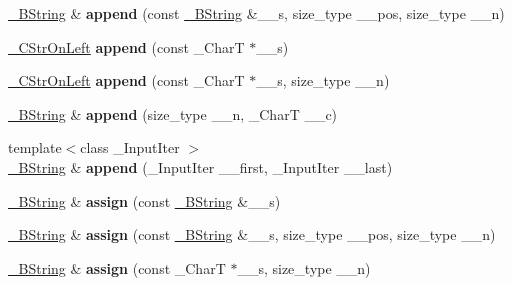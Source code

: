 \begin{DoxyCompactItemize}
\hyperlink{classbasic__string}{\+\_\+\+B\+String} \& {\bfseries append} (const \hyperlink{classbasic__string}{\+\_\+\+B\+String} \&\+\_\+\+\_\+s, size\+\_\+type \+\_\+\+\_\+pos, size\+\_\+type \+\_\+\+\_\+n)
\item 
\mbox{\label{class____bstr__sum_abe3625bf2f36c7c615fcaa46539a7668}} 
\hyperlink{class____bstr__sum}{\+\_\+\+C\+Str\+On\+Left} {\bfseries append} (const \+\_\+\+CharT $\ast$\+\_\+\+\_\+s)
\item 
\mbox{\label{class____bstr__sum_ad84482bb4ffb623cbbfc86500ae9c155}} 
\hyperlink{class____bstr__sum}{\+\_\+\+C\+Str\+On\+Left} {\bfseries append} (const \+\_\+\+CharT $\ast$\+\_\+\+\_\+s, size\+\_\+type \+\_\+\+\_\+n)
\item 
\mbox{\label{class____bstr__sum_a70b665981eb7e860fae274b33fcd22c6}} 
\hyperlink{classbasic__string}{\+\_\+\+B\+String} \& {\bfseries append} (size\+\_\+type \+\_\+\+\_\+n, \+\_\+\+CharT \+\_\+\+\_\+c)
\item 
\mbox{\label{class____bstr__sum_a37d0fe1a75c9d05091e013a2b5ef9282}} 
{\footnotesize template$<$class \+\_\+\+Input\+Iter $>$ }\\\hyperlink{classbasic__string}{\+\_\+\+B\+String} \& {\bfseries append} (\+\_\+\+Input\+Iter \+\_\+\+\_\+first, \+\_\+\+Input\+Iter \+\_\+\+\_\+last)
\item 
\mbox{\label{class____bstr__sum_ad3de9df5cd12af80c0beb891ac32e831}} 
\hyperlink{classbasic__string}{\+\_\+\+B\+String} \& {\bfseries assign} (const \hyperlink{classbasic__string}{\+\_\+\+B\+String} \&\+\_\+\+\_\+s)
\item 
\mbox{\label{class____bstr__sum_ab76e4781489617009085427f0840ce77}} 
\hyperlink{classbasic__string}{\+\_\+\+B\+String} \& {\bfseries assign} (const \hyperlink{classbasic__string}{\+\_\+\+B\+String} \&\+\_\+\+\_\+s, size\+\_\+type \+\_\+\+\_\+pos, size\+\_\+type \+\_\+\+\_\+n)
\item 
\mbox{\label{class____bstr__sum_ae0de2aca9c533341ecf4806264393d23}} 
\hyperlink{classbasic__string}{\+\_\+\+B\+String} \& {\bfseries assign} (const \+\_\+\+CharT $\ast$\+\_\+\+\_\+s, size\+\_\+type \+\_\+\+\_\+n)

\end{DoxyCompactItemize}
